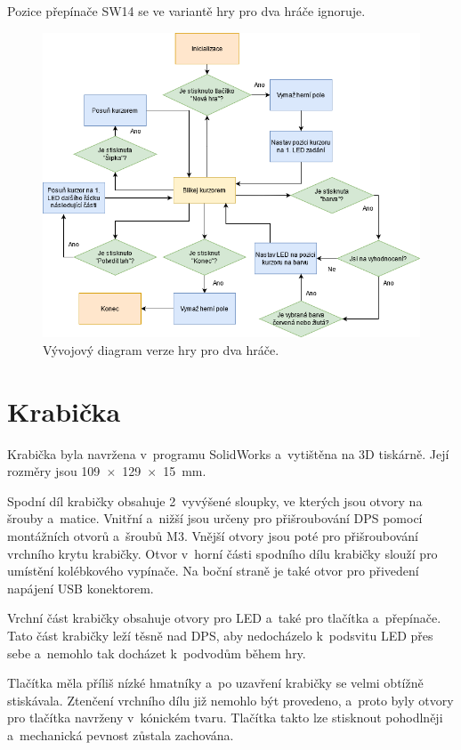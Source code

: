 Pozice přepínače SW14 se ve variantě hry pro dva hráče ignoruje. 

\begin{figure}[!h]
    \begin{center}
        \includegraphics[scale=0.6]{obrazky/vyvojovy_diagram_2_hraci.png}
    \end{center}
    \caption[Vývojový diagram verze hry pro dva hráče]{Vývojový diagram verze hry pro dva hráče.}
    \end{figure}

\chapter{Krabička}
Krabička byla navržena v~programu SolidWorks a~vytištěna na 3D tiskárně. Její rozměry jsou 109~$\times$~129~$\times$~15~mm. 

Spodní díl krabičky obsahuje 2~vyvýšené sloupky, ve kterých jsou otvory
na šrouby a~matice. Vnitřní a~nižší jsou určeny pro přišroubování DPS pomocí montážních otvorů a~šroubů M3. Vnější otvory jsou poté pro přišroubování 
vrchního krytu krabičky. Otvor v~horní části spodního dílu krabičky slouží pro umístění kolébkového vypínače. Na boční straně je také otvor
pro přivedení napájení USB konektorem.

Vrchní část krabičky obsahuje otvory pro LED a~také pro tlačítka a~přepínače. Tato část krabičky leží těsně nad DPS, aby nedocházelo k~podsvitu LED přes
sebe a~nemohlo tak docházet k~podvodům během hry. 

Tlačítka měla příliš nízké hmatníky a~po uzavření krabičky se velmi obtížně stiskávala. 
Ztenčení vrchního dílu již nemohlo být provedeno, a~proto byly otvory pro tlačítka navrženy v~kónickém tvaru. Tlačítka takto lze stisknout pohodlněji
a~mechanická pevnost zůstala zachována. 


